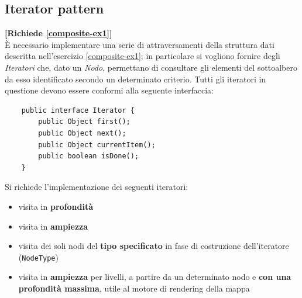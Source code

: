 \documentclass[12pt,a4paper]{article}
\begin{document}
    \subsection{Iterator pattern}
    \begin{Exercise}
    \small\textbf{[Richiede \hyperlink{composite-ex1}{\ref{composite-ex1}}]} \\
        È necessario implementare una serie di attraversamenti della struttura dati descritta nell'esercizio \hyperlink{composite-ex1}{\ref{composite-ex1}}; in particolare si vogliono fornire degli \textit{Iteratori} che, dato un \textit{Nodo}, permettano di consultare gli elementi del sottoalbero da esso identificato secondo un determinato criterio.
        Tutti gli iteratori in questione devono essere conformi alla seguente interfaccia:
        \begin{lstlisting}
    public interface Iterator {
        public Object first();
        public Object next();
        public Object currentItem();
        public boolean isDone();
    }
        \end{lstlisting}
        Si richiede l'implementazione dei seguenti iteratori:
        \begin{itemize}
            \item visita in \textbf{profondità}
            \item visita in \textbf{ampiezza}
            \item visita dei soli nodi del \textbf{tipo specificato} in fase di costruzione dell'iteratore (\texttt{NodeType})
            \item visita in \textbf{ampiezza} per livelli, a partire da un determinato nodo e \textbf{con una profondità massima}, utile al motore di rendering della mappa
        \end{itemize}
    
    \end{Exercise}

\end{document}
